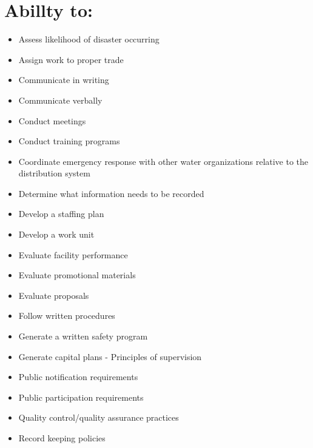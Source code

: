 \documentclass[10pt]{article}
\begin{document}
\section{Abillty to:}
\begin{itemize}
  \item Assess likelihood of disaster occurring

  \item Assign work to proper trade

  \item Communicate in writing

  \item Communicate verbally

  \item Conduct meetings

  \item Conduct training programs

  \item Coordinate emergency response with other water organizations relative to the distribution system

  \item Determine what information needs to be recorded

  \item Develop a staffing plan

  \item Develop a work unit

  \item Evaluate facility performance

  \item Evaluate promotional materials

  \item Evaluate proposals

  \item Follow written procedures

  \item Generate a written safety program

  \item Generate capital plans - Principles of supervision

  \item Public notification requirements

  \item Public participation requirements

  \item Quality control/quality assurance practices

  \item Record keeping policies


\end{itemize}
\end{document}
